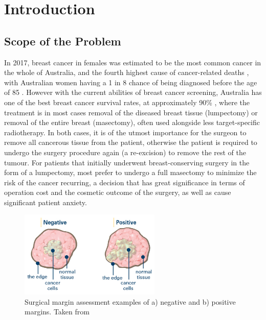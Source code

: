  \chapter{Introduction}

\section{Scope of the Problem}\label{problem}
In 2017, breast cancer in females was estimated to be the most common cancer in the whole of Australia, and the fourth highest cause of cancer-related deaths \cite{australian_institute_of_health_and_welfare_cancer_2017}, with Australian women having a 1 in 8 chance of being diagnosed before the age of 85 \cite{australian_institute_of_health_and_welfare_breast_2012}. However with the current abilities of breast cancer screening, Australia has one of the best breast cancer survival rates, at approximately 90\% \cite{australian_institute_of_health_and_welfare_breast_2012}, where the treatment is in most cases removal of the diseased breast tissue (lumpectomy) or removal of the entire breast (masectomy), often used alongside less target-specific radiotherapy. In both cases, it is of the utmost importance for the surgeon to remove all cancerous tissue from the patient, otherwise the patient is required to undergo the surgery procedure again (a re-excision) to remove the rest of the tumour. For patients that initially underwent breast-conserving surgery in the form of a lumpectomy, most prefer to undergo a full masectomy to minimize the risk of the cancer recurring, a decision that has great significance in terms of operation cost and the cosmetic outcome of the surgery, as well as cause significant patient anxiety.

\begin{figure}
	\centering
    \includegraphics[width=0.6\textwidth]{figures/margins.png}
    \caption{Surgical margin assessment examples of a) negative and b) positive margins. Taken from \cite{breastcancer.org_surgical_2017}}
	    \label{margins}
\end{figure}

